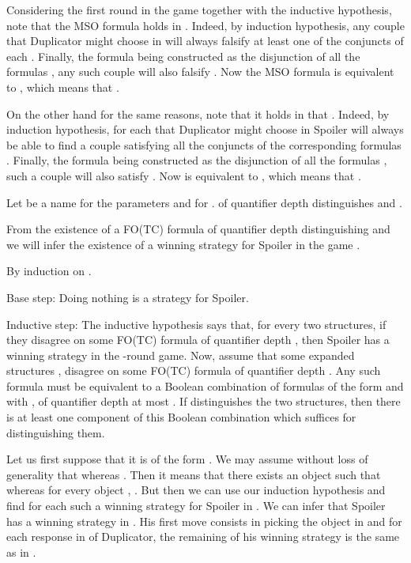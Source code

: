 \documentclass{LMCS}
\newcommand{\mso}{\textsf{MSO}\xspace}
\newcommand{\fotc}{\textsf{FO(TC)}\xspace}
\begin{document}
\begin{iteMize}{}
Considering the first round in the game together with the inductive hypothesis, note that the \mso formula  holds in . Indeed, by induction
hypothesis, any couple  that Duplicator might choose in  will always falsify at least one of the conjuncts of
each . Finally, the formula  being constructed as the disjunction of all the formulas , any such couple
 will also falsify . Now the \mso formula  is equivalent to , which means that .

On the other hand for the same reasons, note that it holds in  that . Indeed, by induction hypothesis, for each  that Duplicator might choose in
 Spoiler will always be able to find a couple  satisfying all the conjuncts of the
corresponding formulas . Finally, the formula  being constructed as the disjunction of all the formulas , such a couple
 will also satisfy . Now  is equivalent to , which means that .

Let  be a name for the parameters  and  for .  of quantifier depth  distinguishes
 and .

\item[]From the existence of a \fotc formula of
quantifier depth  distinguishing  and  we will infer the existence of a winning strategy for Spoiler in
the game .

By induction on . 

Base step: Doing nothing is a strategy for Spoiler.

Inductive step: The inductive hypothesis says that, for every two
structures, if they disagree on some \fotc formula of quantifier
depth , then Spoiler has a winning strategy in the -round
game. Now, assume that some expanded structures ,
 disagree on some \fotc formula  of
quantifier depth . Any such formula must be equivalent to a
Boolean combination of formulas of the form 
and  with ,  of
quantifier depth at most . If  distinguishes the two
structures, then there is at least one component of this Boolean
combination which suffices for distinguishing them.

Let us first suppose that it is of the form . We may assume without loss of generality that
 whereas
. Then it means
that there exists an object  such that  whereas for every object , . But then we can use our induction
hypothesis and find for each such  a winning strategy for
Spoiler in . We
can infer that Spoiler has a winning strategy in . His first move consists in
picking the object  in  and for each response  in  of
Duplicator, the remaining of his winning strategy is the same as in
.


\end{iteMize}
\end{document}
